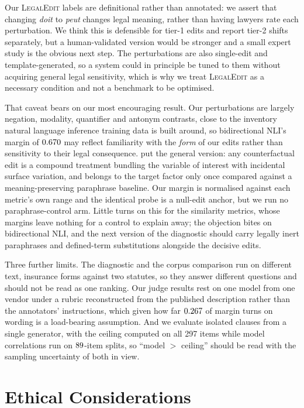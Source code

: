 \documentclass[11pt]{article}
\begin{document}
Our \textsc{LegalEdit} labels are definitional rather than annotated: we assert
that changing \emph{doit} to \emph{peut} changes legal meaning, rather than
having lawyers rate each perturbation. We think this is defensible for tier-1
edits and report tier-2 shifts separately, but a human-validated version would
be stronger and a small expert study is the obvious next step. The perturbations are also single-edit and
template-generated, so a system could in principle be tuned to them without
acquiring general legal sensitivity, which is why we treat \textsc{LegalEdit} as
a necessary condition and not a benchmark to be optimised.

That caveat bears on our most encouraging result. Our perturbations are largely
negation, modality, quantifier and antonym contrasts, close to the inventory
natural language inference training data is built around, so bidirectional NLI's
margin of $0.670$ may reflect familiarity with the \emph{form} of our edits
rather than sensitivity to their legal consequence. \citet{yang2026compared} put
the general version: any counterfactual edit is a compound treatment bundling
the variable of interest with incidental surface variation, and belongs to the
target factor only once compared against a meaning-preserving paraphrase
baseline. Our margin is normalised against each metric's own range and the
identical probe is a null-edit anchor, but we run no paraphrase-control arm.
Little turns on this for the similarity metrics, whose margins leave nothing for
a control to explain away; the objection bites on bidirectional NLI, and the
next version of the diagnostic should carry legally inert paraphrases and
defined-term substitutions alongside the decisive edits.

Three further limits. The diagnostic and the corpus comparison run on different
text, insurance forms against two statutes, so they answer different questions
and should not be read as one ranking. Our judge results rest on one model from
one vendor under a rubric reconstructed from the published description rather
than the annotators' instructions, which given how far $0.267$ of
margin turns on wording is a load-bearing assumption. And we evaluate isolated
clauses from a single generator, with the ceiling computed on all 297 items
while model correlations run on $89$-item splits, so ``model $>$ ceiling''
should be read with the sampling uncertainty of both in view.

\section*{Ethical Considerations}
\label{sec:ethics}
\end{document}
